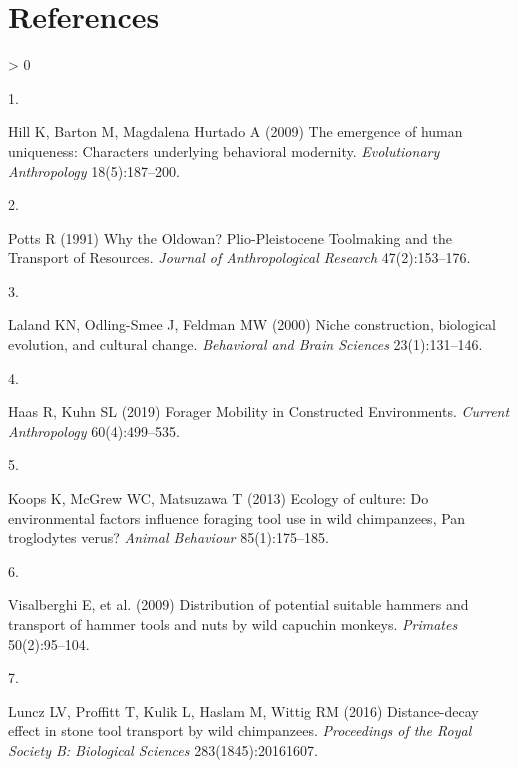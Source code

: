 \documentclass[9pt,twocolumn,twoside,]{pnas-new}
\newlength{\csllabelwidth}
\newlength{\cslhangindent}
\newenvironment{CSLReferences}[3] %
 {%
  \setlength{\parindent}{0pt}
  \ifodd #1 \everypar{\setlength{\hangindent}{\cslhangindent}}\ignorespaces\fi
  \ifnum #2 > 0
  \setlength{\parskip}{#2\baselineskip}
  \fi
 }%
 {}
\newcommand{\CSLLeftMargin}[1]{\parbox[t]{\csllabelwidth}{#1}}
\newcommand{\CSLRightInline}[1]{\parbox[t]{\linewidth - \csllabelwidth}{#1}}
\begin{document}
\showmatmethods
\showacknow
\pnasbreak

\hypertarget{references}{%
\section*{References}\label{references}}

\hypertarget{refs}{}
\begin{CSLReferences}{0}{0}
\leavevmode\hypertarget{ref-hillEmergenceHumanUniqueness2009}{}%
\CSLLeftMargin{1. }
\CSLRightInline{Hill K, Barton M, Magdalena Hurtado A (2009) The
emergence of human uniqueness: {Characters} underlying behavioral
modernity. \emph{Evolutionary Anthropology} 18(5):187--200.}

\leavevmode\hypertarget{ref-pottsWhyOldowanPlioPleistocene1991}{}%
\CSLLeftMargin{2. }
\CSLRightInline{Potts R (1991) Why the {Oldowan}? {Plio}-{Pleistocene
Toolmaking} and the {Transport} of {Resources}. \emph{Journal of
Anthropological Research} 47(2):153--176.}

\leavevmode\hypertarget{ref-lalandNicheConstructionBiological2000}{}%
\CSLLeftMargin{3. }
\CSLRightInline{Laland KN, Odling-Smee J, Feldman MW (2000) Niche
construction, biological evolution, and cultural change.
\emph{Behavioral and Brain Sciences} 23(1):131--146.}

\leavevmode\hypertarget{ref-haasForagerMobilityConstructed2019}{}%
\CSLLeftMargin{4. }
\CSLRightInline{Haas R, Kuhn SL (2019) Forager {Mobility} in
{Constructed Environments}. \emph{Current Anthropology} 60(4):499--535.}

\leavevmode\hypertarget{ref-koopsEcologyCultureEnvironmental2013}{}%
\CSLLeftMargin{5. }
\CSLRightInline{Koops K, McGrew WC, Matsuzawa T (2013) Ecology of
culture: Do environmental factors influence foraging tool use in wild
chimpanzees, {Pan} troglodytes verus? \emph{Animal Behaviour}
85(1):175--185.}

\leavevmode\hypertarget{ref-visalberghiDistributionPotentialSuitable2009}{}%
\CSLLeftMargin{6. }
\CSLRightInline{Visalberghi E, et al. (2009) Distribution of potential
suitable hammers and transport of hammer tools and nuts by wild capuchin
monkeys. \emph{Primates} 50(2):95--104.}

\leavevmode\hypertarget{ref-lunczDistancedecayEffectStone2016}{}%
\CSLLeftMargin{7. }
\CSLRightInline{Luncz LV, Proffitt T, Kulik L, Haslam M, Wittig RM
(2016) Distance-decay effect in stone tool transport by wild
chimpanzees. \emph{Proceedings of the Royal Society B: Biological
Sciences} 283(1845):20161607.}


\end{CSLReferences}
\end{document}
